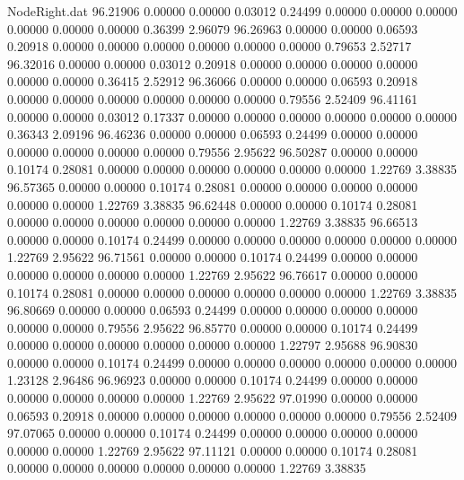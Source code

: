 \begin{filecontents}{NodeRight.dat}
  96.21906    0.00000    0.00000     0.03012    0.24499    0.00000    0.00000    0.00000    0.00000    0.00000    0.00000    0.36399    2.96079
  96.26963    0.00000    0.00000     0.06593    0.20918    0.00000    0.00000    0.00000    0.00000    0.00000    0.00000    0.79653    2.52717
  96.32016    0.00000    0.00000     0.03012    0.20918    0.00000    0.00000    0.00000    0.00000    0.00000    0.00000    0.36415    2.52912
  96.36066    0.00000    0.00000     0.06593    0.20918    0.00000    0.00000    0.00000    0.00000    0.00000    0.00000    0.79556    2.52409
  96.41161    0.00000    0.00000     0.03012    0.17337    0.00000    0.00000    0.00000    0.00000    0.00000    0.00000    0.36343    2.09196
  96.46236    0.00000    0.00000     0.06593    0.24499    0.00000    0.00000    0.00000    0.00000    0.00000    0.00000    0.79556    2.95622
  96.50287    0.00000    0.00000     0.10174    0.28081    0.00000    0.00000    0.00000    0.00000    0.00000    0.00000    1.22769    3.38835
  96.57365    0.00000    0.00000     0.10174    0.28081    0.00000    0.00000    0.00000    0.00000    0.00000    0.00000    1.22769    3.38835
  96.62448    0.00000    0.00000     0.10174    0.28081    0.00000    0.00000    0.00000    0.00000    0.00000    0.00000    1.22769    3.38835
  96.66513    0.00000    0.00000     0.10174    0.24499    0.00000    0.00000    0.00000    0.00000    0.00000    0.00000    1.22769    2.95622
  96.71561    0.00000    0.00000     0.10174    0.24499    0.00000    0.00000    0.00000    0.00000    0.00000    0.00000    1.22769    2.95622
  96.76617    0.00000    0.00000     0.10174    0.28081    0.00000    0.00000    0.00000    0.00000    0.00000    0.00000    1.22769    3.38835
  96.80669    0.00000    0.00000     0.06593    0.24499    0.00000    0.00000    0.00000    0.00000    0.00000    0.00000    0.79556    2.95622
  96.85770    0.00000    0.00000     0.10174    0.24499    0.00000    0.00000    0.00000    0.00000    0.00000    0.00000    1.22797    2.95688
  96.90830    0.00000    0.00000     0.10174    0.24499    0.00000    0.00000    0.00000    0.00000    0.00000    0.00000    1.23128    2.96486
  96.96923    0.00000    0.00000     0.10174    0.24499    0.00000    0.00000    0.00000    0.00000    0.00000    0.00000    1.22769    2.95622
  97.01990    0.00000    0.00000     0.06593    0.20918    0.00000    0.00000    0.00000    0.00000    0.00000    0.00000    0.79556    2.52409
  97.07065    0.00000    0.00000     0.10174    0.24499    0.00000    0.00000    0.00000    0.00000    0.00000    0.00000    1.22769    2.95622
  97.11121    0.00000    0.00000     0.10174    0.28081    0.00000    0.00000    0.00000    0.00000    0.00000    0.00000    1.22769    3.38835

\end{filecontents}

